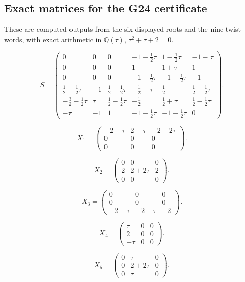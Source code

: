 \subsection*{Exact matrices for the G24 certificate}

These are computed outputs from the six displayed roots and the nine twist words, with exact arithmetic in $\mathbb Q(\tau)$, $\tau^2+\tau+2=0$.

\[S=\begin{pmatrix}
0 & 0 & 0 & -1-\frac{1}{2}\tau & 1-\frac{1}{2}\tau & -1-\tau \\
0 & 0 & 0 & 1 & 1+\tau & 1 \\
0 & 0 & 0 & -1-\frac{1}{2}\tau & -1-\frac{1}{2}\tau & -1 \\
\frac{1}{2}-\frac{1}{2}\tau & -1 & \frac{1}{2}-\frac{1}{2}\tau & -\frac{1}{2}-\tau & \frac{1}{2} & \frac{1}{2}-\frac{1}{2}\tau \\
-\frac{3}{2}-\frac{1}{2}\tau & \tau & \frac{1}{2}-\frac{1}{2}\tau & -\frac{1}{2} & \frac{1}{2}+\tau & \frac{1}{2}-\frac{1}{2}\tau \\
-\tau & -1 & 1 & -1-\frac{1}{2}\tau & -1-\frac{1}{2}\tau & 0
\end{pmatrix}.\]

\[X_{1}=\begin{pmatrix}
-2-\tau & 2-\tau & -2-2\tau \\
0 & 0 & 0 \\
0 & 0 & 0
\end{pmatrix}.\]

\[X_{2}=\begin{pmatrix}
0 & 0 & 0 \\
2 & 2+2\tau & 2 \\
0 & 0 & 0
\end{pmatrix}.\]

\[X_{3}=\begin{pmatrix}
0 & 0 & 0 \\
0 & 0 & 0 \\
-2-\tau & -2-\tau & -2
\end{pmatrix}.\]

\[X_{4}=\begin{pmatrix}
\tau & 0 & 0 \\
2 & 0 & 0 \\
-\tau & 0 & 0
\end{pmatrix}.\]

\[X_{5}=\begin{pmatrix}
0 & \tau & 0 \\
0 & 2+2\tau & 0 \\
0 & \tau & 0
\end{pmatrix}.\]

